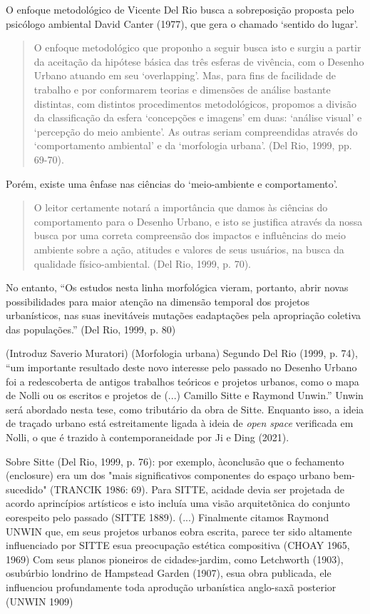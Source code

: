 \documentclass[12pt, a4paper]{book} %
\begin{document}
        O enfoque metodológico de Vicente Del Rio busca a sobreposição proposta pelo psicólogo ambiental David Canter (1977), que gera o chamado `sentido do lugar'.

        \begin{quotation}
            O enfoque metodológico que proponho a seguir busca isto e surgiu a partir da aceitação da hipótese básica das três esferas de vivência, com o Desenho Urbano atuando em seu `overlapping'. Mas, para fins de facilidade de trabalho e por conformarem teorias e dimensões de análise bastante distintas, com distintos procedimentos metodológicos, propomos a divisão da classificação da esfera `concepções e imagens' em duas: `análise visual' e `percepção do meio ambiente'. As outras seriam compreendidas através do `comportamento ambiental' e da `morfologia urbana'. (Del Rio, 1999, pp. 69-70).
        \end{quotation}

        Porém, existe uma ênfase nas ciências do `meio-ambiente e comportamento'.

        \begin{quotation}
            O leitor certamente notará a importância que damos às ciências do comportamento para o Desenho Urbano, e isto se justifica através da nossa busca por uma correta compreensão dos impactos e influências do meio ambiente sobre a ação, atitudes e valores de seus usuários, na busca da qualidade físico-ambiental. (Del Rio, 1999, p. 70).
        \end{quotation}

        No entanto, ``Os estudos nesta linha morfológica vieram, portanto, abrir novas possibilidades para maior atenção na dimensão temporal dos projetos urbanísticos, nas suas inevitáveis mutações eadaptações pela apropriação coletiva das populações.'' (Del Rio, 1999, p. 80)

        (Introduz Saverio Muratori)
        (Morfologia urbana)
        Segundo Del Rio (1999, p. 74), ``um importante resultado deste novo interesse pelo passado no Desenho Urbano foi a redescoberta de antigos trabalhos teóricos e projetos urbanos, como o mapa de Nolli ou os escritos e projetos de (...) Camillo Sitte e Raymond Unwin.'' 
        Unwin será abordado nesta tese, como tributário da obra de Sitte. Enquanto isso, a ideia de traçado urbano está estreitamente ligada à ideia de \textit{open space} verificada em Nolli, o que é trazido à contemporaneidade por Ji e Ding (2021).

        Sobre Sitte (Del Rio, 1999, p. 76): por exemplo, àconclusão que o fechamento (enclosure) era um dos "mais significativos componentes do espaço urbano bem-sucedido" (TRANCIK 1986: 69). Para SITTE, acidade devia ser projetada de acordo aprincípios artísticos e isto incluía uma visão arquitetõnica do conjunto eorespeito pelo passado (SITTE 1889). (...) Finalmente citamos Raymond UNWIN que, em seus projetos urbanos eobra escrita, parece ter sido altamente influenciado por SITTE esua preocupação estética compositiva (CHOAY 1965, 1969) Com seus planos pioneiros de cidades-jardim, como Letchworth (1903), osubúrbio londrino de Hampstead Garden (1907), esua obra publicada, ele influenciou profundamente toda aprodução urbanística anglo-saxã posterior (UNWIN 1909)
\end{document}
